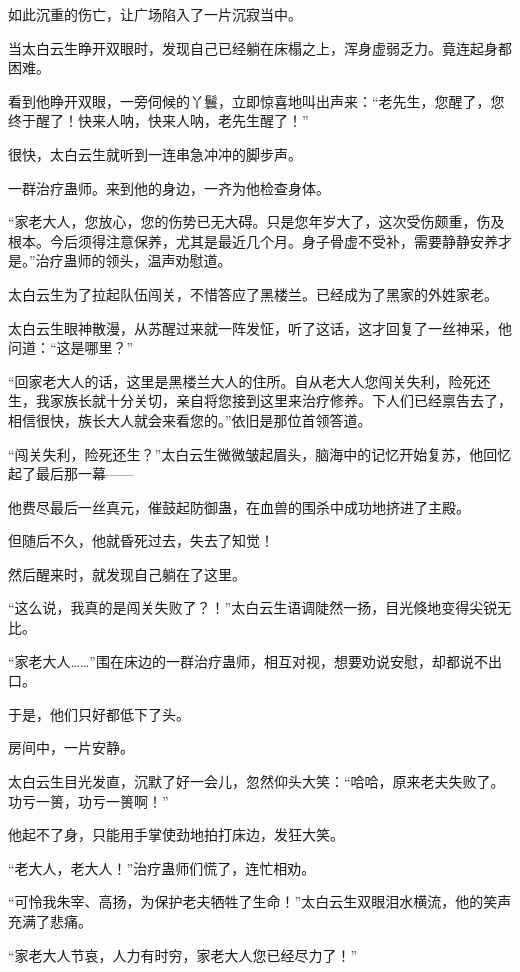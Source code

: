 \begin{this_body}
如此沉重的伤亡，让广场陷入了一片沉寂当中。

当太白云生睁开双眼时，发现自己已经躺在床榻之上，浑身虚弱乏力。竟连起身都困难。

看到他睁开双眼，一旁伺候的丫鬟，立即惊喜地叫出声来：“老先生，您醒了，您终于醒了！快来人呐，快来人呐，老先生醒了！”

很快，太白云生就听到一连串急冲冲的脚步声。

一群治疗蛊师。来到他的身边，一齐为他检查身体。

“家老大人，您放心，您的伤势已无大碍。只是您年岁大了，这次受伤颇重，伤及根本。今后须得注意保养，尤其是最近几个月。身子骨虚不受补，需要静静安养才是。”治疗蛊师的领头，温声劝慰道。

太白云生为了拉起队伍闯关，不惜答应了黑楼兰。已经成为了黑家的外姓家老。

太白云生眼神散漫，从苏醒过来就一阵发怔，听了这话，这才回复了一丝神采，他问道：“这是哪里？”

“回家老大人的话，这里是黑楼兰大人的住所。自从老大人您闯关失利，险死还生，我家族长就十分关切，亲自将您接到这里来治疗修养。下人们已经禀告去了，相信很快，族长大人就会来看您的。”依旧是那位首领答道。

“闯关失利，险死还生？”太白云生微微皱起眉头，脑海中的记忆开始复苏，他回忆起了最后那一幕——

他费尽最后一丝真元，催鼓起防御蛊，在血兽的围杀中成功地挤进了主殿。

但随后不久，他就昏死过去，失去了知觉！

然后醒来时，就发现自己躺在了这里。

“这么说，我真的是闯关失败了？！”太白云生语调陡然一扬，目光倏地变得尖锐无比。

“家老大人……”围在床边的一群治疗蛊师，相互对视，想要劝说安慰，却都说不出口。

于是，他们只好都低下了头。

房间中，一片安静。

太白云生目光发直，沉默了好一会儿，忽然仰头大笑：“哈哈，原来老夫失败了。功亏一篑，功亏一篑啊！”

他起不了身，只能用手掌使劲地拍打床边，发狂大笑。

“老大人，老大人！”治疗蛊师们慌了，连忙相劝。

“可怜我朱宰、高扬，为保护老夫牺牲了生命！”太白云生双眼泪水横流，他的笑声充满了悲痛。

“家老大人节哀，人力有时穷，家老大人您已经尽力了！”


\end{this_body}
